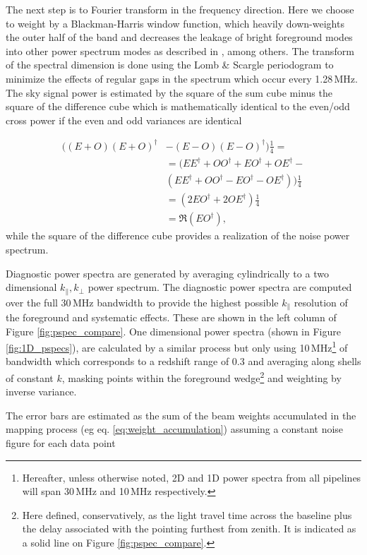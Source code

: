 \documentclass[twolcolumn,iop]{emulateapj}
\begin{document}
The next step is to Fourier transform in the frequency direction. Here we choose to weight by a Blackman-Harris window function, which heavily down-weights the outer half of the band and decreases the leakage of bright foreground modes into other power spectrum modes as described in \cite{Thyagarajan:2013p10039,Parsons:2012p8896,Vedantham:2012p9026}, among others.  The transform of the spectral dimension is done using the Lomb \& Scargle periodogram to minimize the effects of regular gaps in the spectrum which occur every 1.28\,MHz.    The sky signal power is  estimated by the square of the sum cube minus the square of the difference cube which  is mathematically identical to the even/odd cross power if the even and odd variances are identical

\begin{equation}
\begin{split}
((E + O) (E+O)^\dag &- (E-O)(E-O)^\dag)\frac{1}{4} = \\
 &= (EE^\dag + OO^\dag + EO^\dag + OE^\dag - \\
		& (EE^\dag+OO^\dag - EO^\dag - OE^\dag) )\frac{1}{4} \\
&= (2EO^\dag + 2OE^\dag)\frac{1}{4} \\
&=\Re(EO^\dag),
\end{split}
\end{equation}
while the square of the difference cube provides a realization of the noise power spectrum. 


Diagnostic power spectra are generated by averaging cylindrically to a two dimensional $k_{\|},k_{\bot}$ power spectrum. The diagnostic power spectra are computed over the full 30\,MHz bandwidth to provide the highest possible $k_\parallel$ resolution of the foreground and systematic effects.  These are shown in the left column of Figure \ref{fig:pspec_compare}.  One dimensional power spectra (shown in Figure \ref{fig:1D_pspecs}), are calculated by a similar process but only using 10\,MHz\footnote{Hereafter,  unless otherwise noted, 2D and 1D power spectra from all pipelines will span 30\,MHz and 10\,MHz respectively.}  of bandwidth which corresponds to a redshift range of 0.3 and averaging along shells of constant $k$, masking points within the foreground wedge\footnote{Here defined, conservatively, as the light travel time across the baseline plus the delay associated with the pointing furthest from zenith. It is indicated as a solid line on Figure \ref{fig:pspec_compare}.} and weighting by inverse variance. 

The error bars are estimated as the sum of the beam weights accumulated in the mapping process (eg eq. \ref{eq:weight_accumulation}) assuming a constant noise figure for each data point
\end{document}
